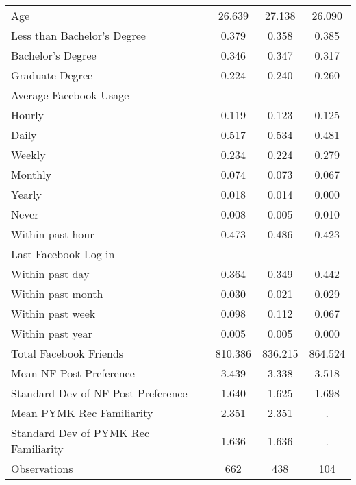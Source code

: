 {\begin{tabular}{l*{3}{c}}
Age                 &      26.639&      27.138&      26.090\\
Less than Bachelor's Degree&       0.379&       0.358&       0.385\\
Bachelor's Degree   &       0.346&       0.347&       0.317\\
Graduate Degree     &       0.224&       0.240&       0.260\\
Average Facebook Usage&            &            &            \\
\hspace{3mm} Hourly &       0.119&       0.123&       0.125\\
\hspace{3mm} Daily  &       0.517&       0.534&       0.481\\
\hspace{3mm} Weekly &       0.234&       0.224&       0.279\\
\hspace{3mm} Monthly&       0.074&       0.073&       0.067\\
\hspace{3mm} Yearly &       0.018&       0.014&       0.000\\
\hspace{3mm} Never  &       0.008&       0.005&       0.010\\
\hspace{3mm} Within past hour&       0.473&       0.486&       0.423\\
Last Facebook Log-in&            &            &            \\
\hspace{3mm} Within past day&       0.364&       0.349&       0.442\\
\hspace{3mm} Within past month&       0.030&       0.021&       0.029\\
\hspace{3mm} Within past week&       0.098&       0.112&       0.067\\
\hspace{3mm} Within past year&       0.005&       0.005&       0.000\\
Total Facebook Friends&     810.386&     836.215&     864.524\\
Mean NF Post Preference&       3.439&       3.338&       3.518\\
Standard Dev of NF Post Preference&       1.640&       1.625&       1.698\\
Mean PYMK Rec Familiarity&       2.351&       2.351&           .\\
Standard Dev of PYMK Rec Familiarity&       1.636&       1.636&           .\\
\midrule
Observations        &         662&         438&         104\\
\bottomrule
\end{tabular}
}
